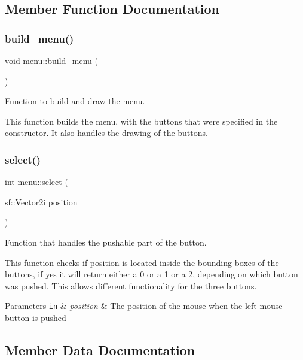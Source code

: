 \subsection{Member Function Documentation}
\mbox{\label{classmenu_a8d194b462b1b180086e5b06a2dbfbdff}} 
\subsubsection{\texorpdfstring{build\+\_\+menu()}{build\_menu()}}
{\footnotesize\ttfamily void menu\+::build\+\_\+menu (\begin{DoxyParamCaption}{ }\end{DoxyParamCaption})}



Function to build and draw the menu. 

This function builds the menu, with the buttons that were specified in the constructor. It also handles the drawing of the buttons. \mbox{\label{classmenu_a06744d58a2aad693d3637d0485aa7984}} 
\subsubsection{\texorpdfstring{select()}{select()}}
{\footnotesize\ttfamily int menu\+::select (\begin{DoxyParamCaption}\item[{sf\+::\+Vector2i}]{position }\end{DoxyParamCaption})}



Function that handles the pushable part of the button. 

This function checks if position is located inside the bounding boxes of the buttons, if yes it will return either a 0 or a 1 or a 2, depending on which button was pushed. This allows different functionality for the three buttons.


\begin{DoxyParams}[1]{Parameters}
\mbox{\tt in}  & {\em position} & The position of the mouse when the left mouse button is pushed \\
\hline
\end{DoxyParams}


\subsection{Member Data Documentation}
\mbox{\label{classmenu_af403beeeb7beef5621f0ea806c9f3e6e}} 
